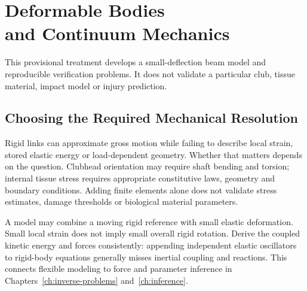 \chapter[Deformable Bodies and Continuum Mechanics]{Deformable Bodies\\and Continuum Mechanics}
\label{ch:deformable}
\begin{gomdraftnotice}
This provisional treatment develops a small-deflection beam model and reproducible
verification problems. It does not validate a particular club, tissue material,
impact model or injury prediction.
\end{gomdraftnotice}

\section{Choosing the Required Mechanical Resolution}
Rigid links can approximate gross motion while failing to describe local strain,
stored elastic energy or load-dependent geometry. Whether that matters depends on
the question. Clubhead orientation may require shaft bending and torsion;
internal tissue stress requires appropriate constitutive laws, geometry and boundary
conditions. Adding finite elements alone does not validate stress estimates,
damage thresholds or biological material parameters.

A model may combine a moving rigid reference with small elastic deformation.
Small local strain does not imply small overall rigid rotation. Derive the coupled
kinetic energy and forces consistently: appending independent elastic oscillators
to rigid-body equations generally misses inertial coupling and reactions.
This connects flexible modeling to force and parameter inference in
Chapters~\ref{ch:inverse-problems} and~\ref{ch:inference}.

